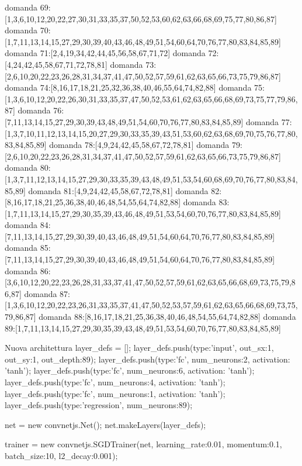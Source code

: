 domanda 69:[1,3,6,10,12,20,22,27,30,31,33,35,37,50,52,53,60,62,63,66,68,69,75,77,80,86,87]
domanda 70:[1,7,11,13,14,15,27,29,30,39,40,43,46,48,49,51,54,60,64,70,76,77,80,83,84,85,89]
domanda 71:[2,4,19,34,42,44,45,56,58,67,71,72]
domanda 72:[4,24,42,45,58,67,71,72,78,81]
domanda 73:[2,6,10,20,22,23,26,28,31,34,37,41,47,50,52,57,59,61,62,63,65,66,73,75,79,86,87]
domanda 74:[8,16,17,18,21,25,32,36,38,40,46,55,64,74,82,88]
domanda 75:[1,3,6,10,12,20,22,26,30,31,33,35,37,47,50,52,53,61,62,63,65,66,68,69,73,75,77,79,86,87]
domanda 76:[7,11,13,14,15,27,29,30,39,43,48,49,51,54,60,70,76,77,80,83,84,85,89]
domanda 77:[1,3,7,10,11,12,13,14,15,20,27,29,30,33,35,39,43,51,53,60,62,63,68,69,70,75,76,77,80,83,84,85,89]
domanda 78:[4,9,24,42,45,58,67,72,78,81]
domanda 79:[2,6,10,20,22,23,26,28,31,34,37,41,47,50,52,57,59,61,62,63,65,66,73,75,79,86,87]
domanda 80:[1,3,7,11,12,13,14,15,27,29,30,33,35,39,43,48,49,51,53,54,60,68,69,70,76,77,80,83,84,85,89]
domanda 81:[4,9,24,42,45,58,67,72,78,81]
domanda 82:[8,16,17,18,21,25,36,38,40,46,48,54,55,64,74,82,88]
domanda 83:[1,7,11,13,14,15,27,29,30,35,39,43,46,48,49,51,53,54,60,70,76,77,80,83,84,85,89]
domanda 84:[7,11,13,14,15,27,29,30,39,40,43,46,48,49,51,54,60,64,70,76,77,80,83,84,85,89]
domanda 85:[7,11,13,14,15,27,29,30,39,40,43,46,48,49,51,54,60,64,70,76,77,80,83,84,85,89]
domanda 86:[3,6,10,12,20,22,23,26,28,31,33,37,41,47,50,52,57,59,61,62,63,65,66,68,69,73,75,79,86,87]
domanda 87:[1,3,6,10,12,20,22,23,26,31,33,35,37,41,47,50,52,53,57,59,61,62,63,65,66,68,69,73,75,79,86,87]
domanda 88:[8,16,17,18,21,25,36,38,40,46,48,54,55,64,74,82,88]
domanda 89:[1,7,11,13,14,15,27,29,30,35,39,43,48,49,51,53,54,60,70,76,77,80,83,84,85,89]


Nuova architettura
layer_defs = [];
layer_defs.push({type:'input', out_sx:1, out_sy:1, out_depth:89});
layer_defs.push({type:'fc', num_neurons:2, activation: 'tanh'});
layer_defs.push({type:'fc', num_neurons:6, activation: 'tanh'});
layer_defs.push({type:'fc', num_neurons:4, activation: 'tanh'});
layer_defs.push({type:'fc', num_neurons:1, activation: 'tanh'});
layer_defs.push({type:'regression', num_neurons:89});

net = new convnetjs.Net();
net.makeLayers(layer_defs);

trainer = new convnetjs.SGDTrainer(net, {learning_rate:0.01, momentum:0.1, batch_size:10, l2_decay:0.001});

